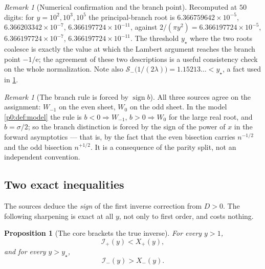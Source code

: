 \documentclass[11pt,a4paper,oneside]{book}
\theoremstyle{plain}
\newtheorem{proposition}[theorem]{Proposition}
\theoremstyle{definition}
\theoremstyle{remark}
\newtheorem{remark}[theorem]{Remark}
\newcommand{\e}{\mathrm{e}}
\newcommand{\Wlam}{W}
\newcommand{\Xcore}{X}
\begin{document}
\begin{remark}[Numerical confirmation and the branch point]
\label{p4:rem:small-root}
Recomputed at $50$ digits: for $y=10^{2},10^{3},10^{5}$ the principal-branch
root is $6.366759642\times10^{-5}$, $6.366203342\times10^{-7}$,
$6.366197724\times10^{-11}$, against $2/(\pi y^{2})=6.366197724\times10^{-5}$,
$6.366197724\times10^{-7}$, $6.366197724\times10^{-11}$.  The threshold
$y_\star$ where the two roots coalesce is exactly the value at which the
Lambert argument reaches the branch point $-1/\e$; the agreement of these two
descriptions is a useful consistency check on the whole normalization.  Note
also $\mathcal S_-\bigl(1/(2\lambda)\bigr)=1.15213\ldots<y_\star$, a fact used
in \cref{p4:prop:core-inequalities}.
\end{remark}

\begin{remark}[The branch rule is forced by $\operatorname{sign}b$]
\label{p4:rem:branch-rule}
All three sources agree on the assignment: $\Wlam_{-1}$ on the even sheet,
$\Wlam_0$ on the odd sheet.  In the model \cref{p0:def:model} the rule is
$b<0\Rightarrow\Wlam_{-1}$, $b>0\Rightarrow\Wlam_0$ for the large real root,
and $b=\sigma/2$; so the branch distinction is forced by the sign of the
power of $x$ in the forward asymptotics --- that is, by the fact that the even
bisection carries $n^{-1/2}$ and the odd bisection $n^{+1/2}$.  It is a
consequence of the parity split, not an independent convention.
\end{remark}

\subsection{Two exact inequalities}

The sources deduce the \emph{sign} of the first inverse correction from
$D>0$.  The following sharpening is exact at all $y$, not only to first order,
and costs nothing.

\begin{proposition}[The core brackets the true inverse]
\label{p4:prop:core-inequalities}
For every $y>1$,
\begin{equation}
  \mathcal I_+(y)<\Xcore_+(y),
  \label{p4:eq:odd-bracket}
\end{equation}
and for every $y>y_\star$,
\begin{equation}
  \mathcal I_-(y)>\Xcore_-(y).
  \label{p4:eq:even-bracket}
\end{equation}
\end{proposition}
\end{document}
